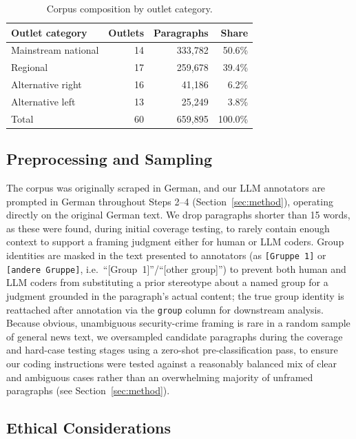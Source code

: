 \documentclass[a4paper,oneside,bibliography=totoc]{scrartcl}
\begin{document}
\begin{table}[htbp]
\centering
\begin{tabular}{lrrr}
\toprule
\textbf{Outlet category} & \textbf{Outlets} & \textbf{Paragraphs} & \textbf{Share} \\
\midrule
Mainstream national & 14 & 333{,}782 & 50.6\% \\
Regional            & 17 & 259{,}678 & 39.4\% \\
Alternative right    & 16 & 41{,}186  & 6.2\%  \\
Alternative left     & 13 & 25{,}249  & 3.8\%  \\
\midrule
Total                & 60 & 659{,}895 & 100.0\% \\
\bottomrule
\end{tabular}
\caption{Corpus composition by outlet category.}
\label{tab:outlets}
\end{table}

\subsection{Preprocessing and Sampling}

The corpus was originally scraped in German, and our LLM annotators are prompted in German throughout Steps 2--4 (Section~\ref{sec:method}), operating directly on the original German text. We drop paragraphs shorter than 15 words, as these were found, during initial coverage testing, to rarely contain enough context to support a framing judgment either for human or LLM coders. Group identities are masked in the text presented to annotators (as \texttt{[Gruppe~1]} or \texttt{[andere Gruppe]}, i.e.\ ``[Group~1]''/``[other group]'') to prevent both human and LLM coders from substituting a prior stereotype about a named group for a judgment grounded in the paragraph's actual content; the true group identity is reattached after annotation via the \texttt{group} column for downstream analysis. Because obvious, unambiguous security-crime framing is rare in a random sample of general news text, we oversampled candidate paragraphs during the coverage and hard-case testing stages using a zero-shot pre-classification pass, to ensure our coding instructions were tested against a reasonably balanced mix of clear and ambiguous cases rather than an overwhelming majority of unframed paragraphs (see Section~\ref{sec:method}).

\subsection{Ethical Considerations}
\end{document}
